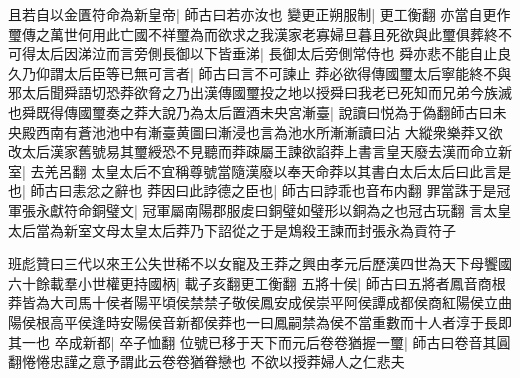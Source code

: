 且若自以金匱符命為新皇帝|{
	師古曰若亦汝也}
變更正朔服制|{
	更工衡翻}
亦當自更作璽傳之萬世何用此亡國不祥璽為而欲求之我漢家老寡婦旦暮且死欲與此璽俱葬終不可得太后因涕泣而言旁側長御以下皆垂涕|{
	長御太后旁側常侍也}
舜亦悲不能自止良久乃仰謂太后臣等已無可言者|{
	師古曰言不可諫止}
莽必欲得傳國璽太后寧能終不與邪太后聞舜語切恐莽欲脅之乃出漢傳國璽投之地以授舜曰我老已死知而兄弟今族滅也舜既得傳國璽奏之莽大說乃為太后置酒未央宮漸臺|{
	說讀曰悦為于偽翻師古曰未央殿西南有蒼池池中有漸臺黄圖曰漸浸也言為池水所漸漸讀曰沾}
大縱衆樂莽又欲改太后漢家舊號易其璽綬恐不見聽而莽疎屬王諫欲諂莽上書言皇天廢去漢而命立新室|{
	去羌呂翻}
太皇太后不宜稱尊號當隨漢廢以奉天命莽以其書白太后太后曰此言是也|{
	師古曰恚忿之辭也}
莽因曰此誖德之臣也|{
	師古曰誖乖也音布内翻}
罪當誅于是冠軍張永獻符命銅璧文|{
	冠軍屬南陽郡服䖍曰銅璧如璧形以銅為之也冠古玩翻}
言太皇太后當為新室文母太皇太后莽乃下詔從之于是鴆殺王諫而封張永為貢符子

班彪贊曰三代以來王公失世稀不以女寵及王莽之興由孝元后歷漢四世為天下母饗國六十餘載羣小世權更持國柄|{
	載子亥翻更工衡翻}
五將十侯|{
	師古曰五將者鳳音商根莽皆為大司馬十侯者陽平頃侯禁禁子敬侯鳳安成侯崇平阿侯譚成都侯商紅陽侯立曲陽侯根高平侯逢時安陽侯音新都侯莽也一曰鳳嗣禁為侯不當重數而十人者淳于長即其一也}
卒成新都|{
	卒子恤翻}
位號已移于天下而元后卷卷猶握一璽|{
	師古曰卷音其圓翻惓惓忠謹之意予謂此云卷卷猶眷戀也}
不欲以授莽婦人之仁悲夫

